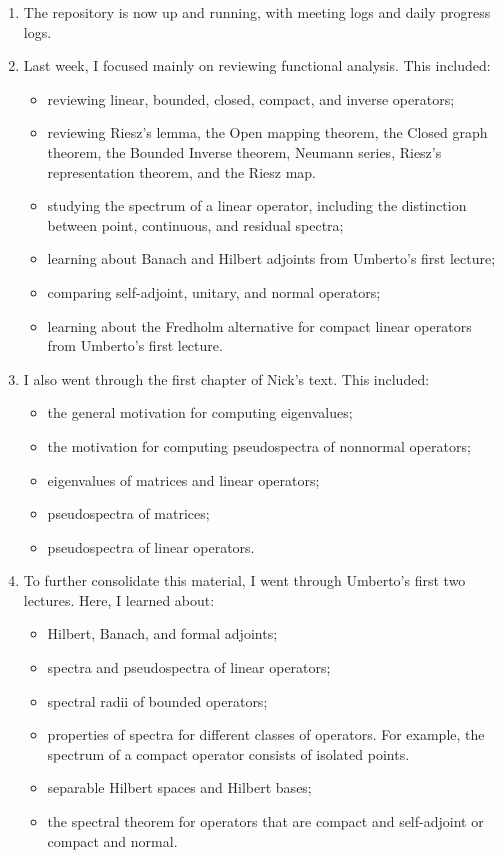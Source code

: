 \documentclass[12pt,a4paper]{article}
\begin{document}
\begin{enumerate}
    \item The repository is now up and running, with meeting logs and daily progress logs.

    \item Last week, I focused mainly on reviewing functional analysis. This included:
    \begin{itemize}
        \item reviewing linear, bounded, closed, compact, and inverse operators;
        \item reviewing Riesz's lemma, the Open mapping theorem, the Closed graph theorem, the Bounded Inverse theorem, Neumann series, Riesz's representation theorem, and the Riesz map. 
        \item studying the spectrum of a linear operator, including the distinction between point, continuous, and residual spectra;
        \item learning about Banach and Hilbert adjoints from Umberto's first lecture;
        \item comparing self-adjoint, unitary, and normal operators;
        \item learning about the Fredholm alternative for compact linear operators from Umberto's first lecture.
    \end{itemize}

    \item I also went through the first chapter of Nick's text. This included:
    \begin{itemize}
        \item the general motivation for computing eigenvalues;
        \item the motivation for computing pseudospectra of nonnormal operators;
        \item eigenvalues of matrices and linear operators;
        \item pseudospectra of matrices;
        \item pseudospectra of linear operators.
    \end{itemize}

    \item To further consolidate this material, I went through Umberto's first two lectures. Here, I learned about:
    \begin{itemize}
        \item Hilbert, Banach, and formal adjoints;
        \item spectra and pseudospectra of linear operators;
        \item spectral radii of bounded operators;
        \item properties of spectra for different classes of operators. For example, the spectrum of a compact operator consists of isolated points.
        \item separable Hilbert spaces and Hilbert bases;
        \item the spectral theorem for operators that are compact and self-adjoint or compact and normal.
    \end{itemize}


\end{enumerate}
\end{document}
